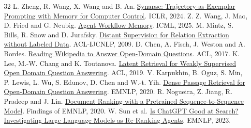 \begin{thebibliography}{32}
 L. Zheng, R. Wang, X. Wang and B. An. \href{https://proceedings.iclr.cc/paper_files/paper/2024/hash/52f050499cf82fa8efb588e263f6f3a7-Abstract-Conference.html}{Synapse: Trajectory-as-Exemplar Prompting with Memory for Computer Control}. ICLR, 2024.
 Z. Z. Wang, J. Mao, D. Fried and G. Neubig. \href{https://proceedings.mlr.press/v267/wang25bx.html}{Agent Workflow Memory}. ICML, 2025.
 M. Mintz, S. Bills, R. Snow and D. Jurafsky. \href{https://aclanthology.org/P09-1113/}{Distant Supervision for Relation Extraction without Labeled Data}. ACL-IJCNLP, 2009.
 D. Chen, A. Fisch, J. Weston and A. Bordes. \href{https://aclanthology.org/P17-1171/}{Reading Wikipedia to Answer Open-Domain Questions}. ACL, 2017.
 K. Lee, M.-W. Chang and K. Toutanova. \href{https://aclanthology.org/P19-1612/}{Latent Retrieval for Weakly Supervised Open Domain Question Answering}. ACL, 2019.
 V. Karpukhin, B. Oguz, S. Min, P. Lewis, L. Wu, S. Edunov, D. Chen and W.-t. Yih. \href{https://aclanthology.org/2020.emnlp-main.550/}{Dense Passage Retrieval for Open-Domain Question Answering}. EMNLP, 2020.
 R. Nogueira, Z. Jiang, R. Pradeep and J. Lin. \href{https://aclanthology.org/2020.findings-emnlp.63/}{Document Ranking with a Pretrained Sequence-to-Sequence Model}. Findings of EMNLP, 2020.
 W. Sun et al. \href{https://aclanthology.org/2023.emnlp-main.923/}{Is ChatGPT Good at Search? Investigating Large Language Models as Re-Ranking Agents}. EMNLP, 2023.
\end{thebibliography}
\endgroup
